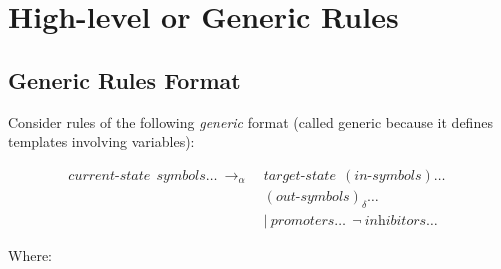 \section{High-level or Generic Rules}

\subsection{\label{sec:cps:genericrules}Generic Rules Format}
Consider rules of the following \emph{generic} format 
(called generic because it defines templates involving variables):
\begin{framed}
\vspace{-0.6cm}
\begin{align*}
\textit{current-state} ~~ \textit{symbols} \dots ~ \rightarrow_\alpha ~ & \textit{target-state} ~~ (\textit{in-symbols}) \dots ~~ \\
 & (\textit{out-symbols})_\delta \dots \\
 & | ~  \textit{promoters} \dots ~~ \neg ~  \textit{inhibitors} \dots
\end{align*}
\vspace{-0.8cm}
\end{framed}
Where:
